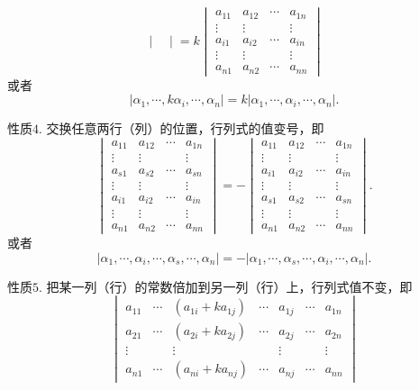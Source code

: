 \begin{prop}[行列式的性质]
$$\begin{vmatrix}
\end{vmatrix} = k\begin{vmatrix}
a_{11} & a_{12} & \cdots & a_{1n} \\ \vdots & \vdots & & \vdots \\ a_{i1} & a_{i2} & \cdots & a_{in} \\ \vdots & \vdots & & \vdots \\ a_{n1} & a_{n2} & \cdots & a_{nn}
\end{vmatrix}$$
或者
$$\left|\alpha_1, \cdots, k\alpha_i, \cdots, \alpha_n \right| = k \left|\alpha_1, \cdots, \alpha_i, \cdots, \alpha_n \right|.$$
\item[性质$4$.] 交换任意两行（列）的位置，行列式的值变号，即
$$\begin{vmatrix}
a_{11} & a_{12} & \cdots & a_{1n} \\ \vdots & \vdots & & \vdots \\ a_{s1} & a_{s2} & \cdots & a_{sn} \\ \vdots & \vdots & & \vdots \\ a_{i1} & a_{i2} & \cdots & a_{in} \\ \vdots & \vdots & & \vdots \\ a_{n1} & a_{n2} & \cdots & a_{nn}
\end{vmatrix} = - \begin{vmatrix}
a_{11} & a_{12} & \cdots & a_{1n} \\ \vdots & \vdots & & \vdots \\ a_{i1} & a_{i2} & \cdots & a_{in} \\ \vdots & \vdots & & \vdots \\ a_{s1} & a_{s2} & \cdots & a_{sn} \\ \vdots & \vdots & & \vdots \\ a_{n1} & a_{n2} & \cdots & a_{nn}
\end{vmatrix}.$$
或者
$$\left|\alpha_1, \cdots, \alpha_i, \cdots, \alpha_s, \cdots, \alpha_n \right| = -\left|\alpha_1, \cdots, \alpha_s, \cdots, \alpha_i, \cdots, \alpha_n \right|.$$
\item[性质$5$.] 把某一列（行）的常数倍加到另一列（行）上，行列式值不变，即
$$\begin{vmatrix}
a_{11} & \cdots & (a_{1i} + ka_{1j}) & \cdots & a_{1j} & \cdots & a_{1n} \\ a_{21} & \cdots & (a_{2i} + ka_{2j}) & \cdots & a_{2j} & \cdots & a_{2n} \\ \vdots & & \vdots & & \vdots & & \vdots \\ a_{n1} & \cdots & (a_{ni} + ka_{nj}) & \cdots & a_{nj} & \cdots & a_{nn}

\end{vmatrix}$$
\end{prop}
